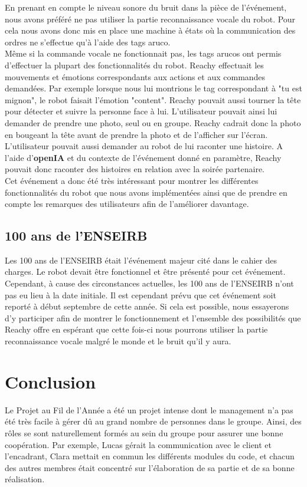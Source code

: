 \documentclass[a4paper,french]{article}
\begin{document}
En prenant en compte le niveau sonore du bruit dans la pièce de l'événement, nous avons préféré ne pas utiliser la partie reconnaissance vocale du robot. Pour cela nous avons donc mis en place une machine à états où la communication des ordres ne s'effectue qu'à l'aide des tags aruco.\\

Même si la commande vocale ne fonctionnait pas, les tags arucos ont permis d'effectuer la plupart des fonctionnalités du robot. Reachy effectuait les mouvements et émotions correspondants aux actions et aux commandes demandées. Par exemple lorsque nous lui montrions le tag correspondant à "tu est mignon", le robot faisait l'émotion "content". Reachy pouvait aussi tourner la tête pour détecter et suivre la personne face à lui. L'utilisateur pouvait ainsi lui demander de prendre une photo, seul ou en groupe. Reachy cadrait donc la photo en bougeant la tête avant de prendre la photo et de l'afficher sur l'écran. L'utilisateur pouvait aussi demander au robot de lui raconter une histoire. A l'aide d'\textbf{openIA} et du contexte de l'événement donné en paramètre, Reachy pouvait donc raconter des histoires en relation avec la soirée partenaire.\\

Cet événement a donc été très intéressant pour montrer les différentes fonctionnalités du robot que nous avons implémentées ainsi que de prendre en compte les remarques des utilisateurs afin de l'améliorer davantage.

\subsection{100 ans de l'ENSEIRB}
Les 100 ans de l'ENSEIRB était l'événement majeur cité dans le cahier des charges. Le robot devait être fonctionnel et être présenté pour cet événement. Cependant, à cause des circonstances actuelles, les 100 ans de l'ENSEIRB n'ont pas eu lieu à la date initiale. Il est cependant prévu que cet événement soit reporté à début septembre de cette année. Si cela est possible, nous essayerons d'y participer afin de montrer le fonctionnement et l'ensemble des possibilités que Reachy offre en espérant que cette fois-ci nous pourrons utiliser la partie reconnaissance vocale malgré le monde et le bruit qu'il y aura. 

\newpage
\section{Conclusion}
Le Projet au Fil de l'Année a été un projet intense dont le management n'a pas été très facile à gérer dû au grand nombre de personnes dans le groupe. Ainsi, des rôles se sont naturellement formés au sein du groupe pour assurer une bonne coopération. Par exemple, Lucas gérait la communication avec le client et l'encadrant, Clara mettait en commun les différents modules du code, et chacun des autres membres était concentré sur l'élaboration de sa partie et de sa bonne réalisation. \\
\end{document}
